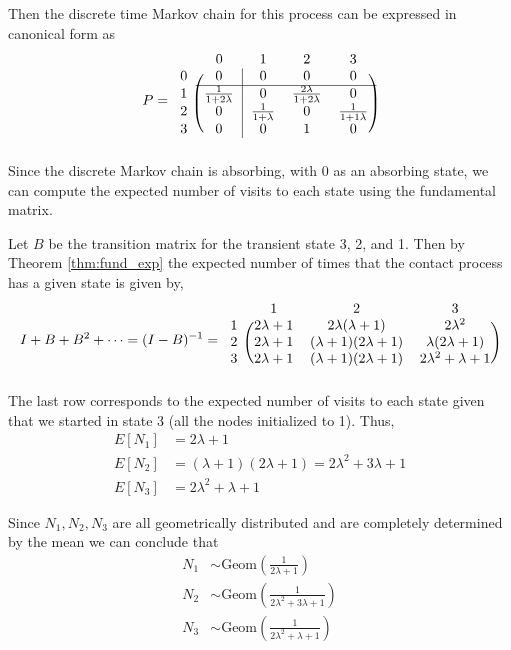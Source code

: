 \documentclass{article}
\theoremstyle{plain}
\theoremstyle{definition}
\theoremstyle{remark}
\begin{document}
Then the discrete time Markov chain for this process can be expressed in canonical form as
$$
P = \begin{blockarray}{ccccc}
    & 0 & 1 & 2 & 3\\
    \begin{block}{c(c|ccc))}
        0 & 0 & 0 & 0 & 0 \\
       \cline{2-5}
        1 & \frac{1}{1 + 2\lambda} & 0 &
        \frac{2\lambda}{1 + 2\lambda} & 0\\
        2 & 0 & \frac{1}{1 + \lambda} & 0 & \frac{1}{1 + 1\lambda}\\
        3 & 0 & 0 & 1 & 0\\
    \end{block}
\end{blockarray}
$$
Since the discrete Markov chain is absorbing, with 0 as an absorbing state, we can compute the expected number of visits to each state using the fundamental matrix.

Let $B$ be the transition matrix for the transient state 3, 2, and 1.
Then by Theorem \ref{thm:fund_exp} the expected number of times that the contact process has a given state is given by,
$$
    I + B + B^2 + \cdots = (I - B)^{-1} = \begin{blockarray}{cccc}
    & 1 & 2 & 3\\
    \begin{block}{c(ccc))}
    1 & 2\lambda + 1 & 2 \lambda ( \lambda + 1) & 2 \lambda^2\\
    2 & 2 \lambda + 1 & (\lambda + 1)(2 \lambda + 1) & \lambda (2 \lambda + 1)\\
    3 & 2 \lambda + 1 & (\lambda + 1) (2 \lambda + 1) & 2 \lambda^2 + \lambda + 1\\
    \end{block}
    \end{blockarray}
$$
The last row corresponds to the expected number of visits to each state given that we started in state 3 (all the nodes initialized to 1).
Thus,
\begin{align*}
    E[N_1] &= 2 \lambda + 1\\
    E[N_2] &= (\lambda + 1) (2 \lambda + 1) = 2\lambda^2 + 3 \lambda + 1\\
    E[N_3] &=  2 \lambda^2 + \lambda + 1
\end{align*}

Since $N_1, N_2, N_3$ are all geometrically distributed and are completely determined by the mean we can conclude that
\begin{align*}
    N_1 &\sim  \text{Geom}\left(\frac{1}{2 \lambda + 1} \right)\\
    N_2 &\sim \text{Geom}\left(\frac{1}{2\lambda^2 + 3 \lambda + 1} \right)\\
    N_3 &\sim  \text{Geom}\left(\frac{1}{2 \lambda^2 + \lambda + 1}\right)
\end{align*}
\end{document}
